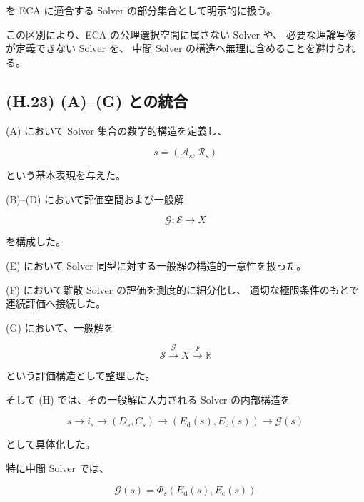 \documentclass[a4paper,11pt]{article}
\begin{document}
を ECA に適合する Solver の部分集合として明示的に扱う。

この区別により、ECA の公理選択空間に属さない Solver や、
必要な理論写像が定義できない Solver を、
中間 Solver の構造へ無理に含めることを避けられる。


\subsection{(H.23) (A)--(G) との統合}
\label{subsec:H23}

(A) において Solver 集合の数学的構造を定義し、

\begin{equation}
    s=(\mathcal{A}_s,\mathcal{R}_s)
\end{equation}

という基本表現を与えた。

(B)--(D) において評価空間および一般解

\begin{equation}
    \mathcal{G}:
    \mathcal{S}\to X
\end{equation}

を構成した。

(E) において Solver 同型に対する一般解の構造的一意性を扱った。

(F) において離散 Solver の評価を測度的に細分化し、
適切な極限条件のもとで連続評価へ接続した。

(G) において、一般解を

\begin{equation}
    \mathcal{S}
    \xrightarrow{\mathcal{G}}
    X
    \xrightarrow{\Psi}
    \mathbb{R}
\end{equation}

という評価構造として整理した。

そして (H) では、その一般解に入力される Solver の内部構造を

\begin{equation}
    \boxed{
        s
        \longrightarrow
        i_s
        \longrightarrow
        (D_s,C_s)
        \longrightarrow
        (E_{\mathrm d}(s),E_{\mathrm c}(s))
        \longrightarrow
        \mathcal{G}(s)
    }
    \label{eq:H-complete-chain}
\end{equation}

として具体化した。

特に中間 Solver では、

\begin{equation}
    \boxed{
        \mathcal{G}(s)
        =
        \Phi_s
        \left(
            E_{\mathrm d}(s),
            E_{\mathrm c}(s)
        \right)
    }
\end{equation}
\end{document}
